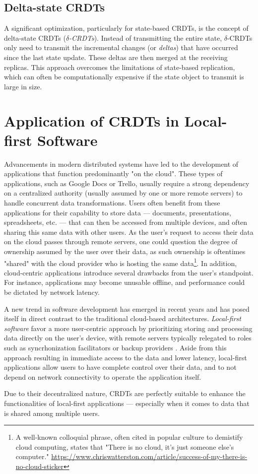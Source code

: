 \subsection{Delta-state CRDTs}
A significant optimization, particularly for state-based CRDTs, is the concept of
delta-state CRDTs (\textit{$\delta$-CRDTs}). Instead of transmitting the entire state,
$\delta$-CRDTs only need to transmit the incremental changes (or \textit{deltas}) that have
occurred since the last state update. These deltas are then merged at the receiving
replicas. This approach overcomes the limitations of state-based replication, which can
often be computationally expensive if the state object to transmit is large in size.

\section{Application of CRDTs in Local-first Software}
Advancements in modern distributed systems have led to the development of applications that
function predominantly "on the cloud". These types of applications, such as Google Docs or
Trello, usually require a strong dependency on a centralized authority (usually assumed by
one or more remote servers) to handle concurrent data transformations. Users often benefit
from these applications for their capability to store data --- documents, presentations,
spreadsheets, etc. --- that can then be accessed from multiple devices, and often sharing
this same data with other users. As the user's request to access their data on the cloud
passes through remote servers, one could question the degree of ownership assumed by the
user over their data, as such ownership is oftentimes "shared" with the cloud provider who
is hosting the same data\footnote{
    A well-known colloquial phrase, often cited in popular culture to demistify cloud
    computing, states that "There is no cloud, it's just someone else's computer."
    \url{https://www.chriswatterston.com/article/success-of-my-there-is-no-cloud-sticker}
}. In addition, cloud-centric applications introduce several drawbacks from the user's
standpoint. For instance, applications may become unusable offline, and performance could be
dictated by network latency.

A new trend in software development has emerged in recent years and has posed itself in
direct contrast to the traditional cloud-based architectures. \textit{Local-first software}
favor a more user-centric approach by prioritizing storing and processing data directly on
the user's device, with remote servers typically relegated to roles such as syncrhonization
facilitators or backup providers \cite{kleppmann2019local}. Aside from this approach
resulting in immediate access to the data and lower latency, local-first applications allow
users to have complete control over their data, and to not depend on network connectivity to
operate the application itself.

Due to their decentralized nature, CRDTs are perfectly suitable to enhance the
functionalities of local-first applications --- especially when it comes to data that is
shared among multiple users. 